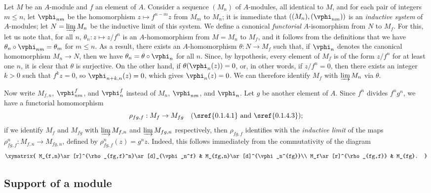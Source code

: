 \begin{env}[1.6.1]
\label{0.1.6.1}
Let $M$ be an $A$-module and $f$ an element of $A$.
Consider a sequence $(M_n)$ of $A$-modules, all identical to $M$, and for each pair of integers $m\leq n$, let $\vphi_{nm}$ be the homomorphism $z\mapsto f^{n-m}z$ from $M_m$ to $M_n$; it is immediate that $((M_n),(\vphi_{nm}))$ is an \emph{inductive system} of $A$-modules; let $N=\varinjlim M_n$ be the inductive limit of this system.
We define a canonical \emph{functorial} $A$-isomorphism from $N$ to $M_f$.
For this, let us note that, for all $n$, $\theta_n:z\mapsto z/f^n$ is an $A$-homomorphism from $M=M_n$ to $M_f$, and it follows from the definitions that we have $\theta_n\circ\vphi_{nm}=\theta_m$ for $m\leq n$.
As a result, there exists an $A$-homomorphism $\theta:N\to M_f$ such that, if $\vphi_n$ denotes the canonical homomorphism $M_n\to N$, then we have $\theta_n=\theta\circ\vphi_n$ for all $n$.
Since, by hypothesis, every element of $M_f$ is of the form $z/f^n$ for at least one $n$, it is clear that $\theta$ is surjective.
On the other hand, if $\theta(\vphi_n(z))=0$, or, in other words, if $z/f^n=0$, then there exists an integer $k>0$ such that $f^k z=0$, so $\vphi_{n+k,n}(z)=0$, which gives $\vphi_n(z)=0$.
We can therefore identify $M_f$ with $\varinjlim M_n$ via $\theta$.
\end{env}

\begin{env}[1.6.2]
\label{0.1.6.2}
Now write $M_{f,n}$, $\vphi_{nm}^f$, and $\vphi_n^f$ instead of $M_n$, $\vphi_{nm}$, and $\vphi_n$.
Let $g$ be another element of $A$.
Since $f^n$ divides $f^n g^n$, we have a functorial homomorphism
\[
  \rho_{fg,f}:M_f\to M_{fg}\quad(\sref{0.1.4.1}\text{ and }\sref{0.1.4.3});
\]
if
we identify $M_f$ and $M_{fg}$ with $\varinjlim M_{f,n}$ and $\varinjlim M_{fg,n}$ respectively, then $\rho_{fg,f}$ identifies with the \emph{inductive limit} of the maps $\rho_{fg,f}^n:M_{f,n}\to M_{fg,n}$, defined by $\rho_{fg,f}^n(z)=g^n z$.
Indeed, this follows immediately from the commutativity of the diagram
\[
  \xymatrix{
    M_{f,n}\ar[r]^{\rho_{fg,f}^n}\ar[d]_{\vphi_n^f} &
    M_{fg,n}\ar[d]^{\vphi_n^{fg}}\\
    M_f\ar[r]^{\rho_{fg,f}} &
    M_{fg}.
  }
\]
\end{env}

\subsection{Support of a module}
\label{subsection:0.1.7}

